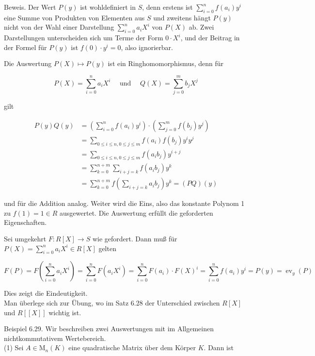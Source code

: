 \documentclass[10pt, letterpaper]{article}
\begin{document}
Beweis. Der Wert $P(y)$ ist wohldefiniert in $S$, denn erstens ist $\sum_{i=0}^{n} f\left(a_{i}\right) y^{i}$ eine Summe von Produkten von Elementen aus $S$ und zweitens hängt $P(y)$ nicht von der Wahl einer Darstellung $\sum_{i=0}^{n} a_{i} X^{i}$ von $P(X)$ ab. Zwei Darstellungen unterscheiden sich um Terme der Form $0 \cdot X^{i}$, und der Beitrag in der Formel für $P(y)$ ist $f(0) \cdot y^{i}=0$, also ignorierbar.

Die Auswertung $P(X) \mapsto P(y)$ ist ein Ringhomomorphismus, denn für

$$
P(X)=\sum_{i=0}^{n} a_{i} X^{i} \quad \text { und } \quad Q(X)=\sum_{j=0}^{m} b_{j} X^{j}
$$

gilt

$$
\begin{aligned}
P(y) Q(y) & =\left(\sum_{i=0}^{n} f\left(a_{i}\right) y^{i}\right) \cdot\left(\sum_{j=0}^{m} f\left(b_{j}\right) y^{j}\right) \\
& =\sum_{0 \leq i \leq n, 0 \leq j \leq m} f\left(a_{i}\right) f\left(b_{j}\right) y^{i} y^{j} \\
& =\sum_{0 \leq i \leq n, 0 \leq j \leq m} f\left(a_{i} b_{j}\right) y^{i+j} \\
& =\sum_{k=0}^{n+m} \sum_{i+j=k} f\left(a_{i} b_{j}\right) y^{k} \\
& =\sum_{k=0}^{n+m} f\left(\sum_{i+j=k} a_{i} b_{j}\right) y^{k}=(P Q)(y)
\end{aligned}
$$

und für die Addition analog. Weiter wird die Eins, also das konstante Polynom 1 zu $f(1)=1 \in R$ ausgewertet. Die Auswertung erfüllt die geforderten Eigenschaften.

Sei umgekehrt $F: R[X] \rightarrow S$ wie gefordert. Dann muß für $P(X)=\sum_{i=0}^{n} a_{i} X^{i} \in R[X]$ gelten

$$
F(P)=F\left(\sum_{i=0}^{n} a_{i} X^{i}\right)=\sum_{i=0}^{n} F\left(a_{i} X^{i}\right)=\sum_{i=0}^{n} F\left(a_{i}\right) \cdot F(X)^{i}=\sum_{i=0}^{n} f\left(a_{i}\right) y^{i}=P(y)=\operatorname{ev}_{y}(P)
$$

Dies zeigt die Eindeutigkeit.\\
Man überlege sich zur Übung, wo im Satz 6.28 der Unterschied zwischen $R[X]$ und $R[[X]]$ wichtig ist.

Beispiel 6.29. Wir beschreiben zwei Auswertungen mit im Allgemeinen nichtkommutativem Wertebereich.\\
(1) Sei $A \in \mathrm{M}_{n}(K)$ eine quadratische Matrix über dem Körper $K$. Dann ist
\end{document}
